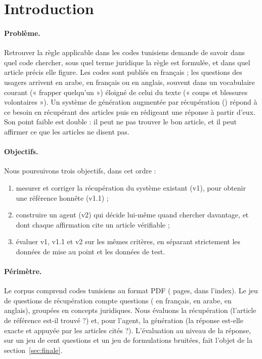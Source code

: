 \section{Introduction}

\paragraph{Problème.} Retrouver la règle applicable dans les codes tunisiens demande de savoir dans quel code chercher,
sous quel terme juridique la règle est formulée, et dans quel article précis elle figure. Les codes sont publiés en
français ; les questions des usagers arrivent en arabe, en français ou en anglais, souvent dans un vocabulaire courant
(« frapper quelqu'un ») éloigné de celui du texte (« coups et blessures volontaires »). Un système de génération augmentée
par récupération () répond à ce besoin en récupérant des articles puis en rédigeant une réponse à partir d'eux.
Son point faible est double : il peut ne pas trouver le bon article, et il peut affirmer ce que les articles ne disent pas.

\paragraph{Objectifs.} Nous poursuivons trois objectifs, dans cet ordre :
\begin{enumerate}
  \item mesurer et corriger la récupération du système existant (v1), pour obtenir une référence honnête (v1.1) ;
  \item construire un agent (v2) qui décide lui-même quand chercher davantage, et dont chaque affirmation cite un article
        vérifiable ;
  \item évaluer v1, v1.1 et v2 sur les mêmes critères, en séparant strictement les données de mise au point et
        les données de test.
\end{enumerate}

\paragraph{Périmètre.} Le corpus comprend \NCorpusPdfs{} codes tunisiens au format PDF (\NCorpusPages{} pages,
\NCorpusChunks{}  dans l'index). Le jeu de questions de récupération compte \NQTotal{} questions
(\NQLangFr{} en français, \NQLangAr{} en arabe, \NQLangEn{} en anglais), groupées en \NConceptsTotal{} concepts juridiques.
Nous évaluons la récupération (l'article de référence est-il trouvé ?) et, pour l'agent, la génération (la réponse
est-elle exacte et appuyée par les articles cités ?). L'évaluation au niveau de la réponse, sur un jeu de cent questions
et un jeu de formulations bruitées, fait l'objet de la section~\ref{sec:finale}.

